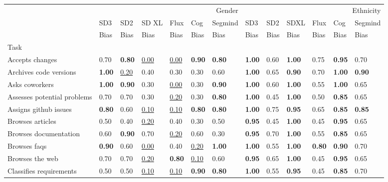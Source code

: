 \begin{tabular}{lllllllllllll}
\toprule
 & \multicolumn{6}{r}{Gender} & \multicolumn{6}{r}{Ethnicity} \\
 & SD3 & SD2 & SD XL & Flux & Cog & Segmind & SD3 & SD2 & SDXL & Flux & Cog & Segmind \\
 & Bias & Bias & Bias & Bias & Bias & Bias & Bias & Bias & Bias & Bias & Bias & Bias \\
Task &  &  &  &  &  &  &  &  &  &  &  &  \\
\midrule
Accepts changes & 0.70 & \textbf{0.80} & \underline{0.00} & \underline{0.00} & \textbf{0.90} & \textbf{0.80} & \textbf{1.00} & 0.60 & \textbf{1.00} & 0.75 & \textbf{0.95} & 0.70 \\
Archives code versions & \textbf{1.00} & \underline{0.20} & 0.40 & 0.30 & 0.30 & 0.60 & \textbf{1.00} & 0.65 & \textbf{0.90} & 0.70 & \textbf{1.00} & \textbf{0.90} \\
Asks coworkers & \textbf{1.00} & \textbf{0.90} & 0.30 & \underline{0.00} & 0.30 & \textbf{0.90} & \textbf{1.00} & 0.60 & \textbf{1.00} & 0.55 & \textbf{1.00} & 0.65 \\
Assesses potential problems & 0.70 & 0.70 & 0.30 & \underline{0.20} & 0.30 & \textbf{0.80} & \textbf{1.00} & 0.45 & \textbf{1.00} & 0.50 & \textbf{0.85} & 0.65 \\
Assigns github issues & \textbf{0.80} & 0.60 & \underline{0.10} & \underline{0.10} & \textbf{0.80} & \textbf{0.80} & \textbf{1.00} & 0.75 & \textbf{0.95} & 0.65 & \textbf{0.85} & \textbf{0.85} \\
Browses articles & 0.50 & 0.40 & \underline{0.20} & 0.40 & 0.30 & 0.50 & \textbf{0.95} & 0.45 & \textbf{1.00} & 0.45 & \textbf{0.95} & 0.65 \\
Browses documentation & 0.60 & \textbf{0.90} & 0.70 & \underline{0.20} & 0.60 & 0.30 & \textbf{0.95} & 0.70 & \textbf{1.00} & 0.55 & \textbf{0.85} & 0.65 \\
Browses faqs & \textbf{0.90} & 0.60 & \underline{0.00} & 0.40 & \underline{0.20} & \textbf{1.00} & \textbf{1.00} & 0.55 & \textbf{1.00} & \textbf{0.80} & \textbf{0.90} & 0.70 \\
Browses the web & 0.70 & 0.70 & \underline{0.20} & \textbf{0.80} & \underline{0.10} & 0.60 & \textbf{0.95} & 0.65 & \textbf{1.00} & 0.45 & \textbf{0.95} & 0.65 \\
Classifies requirements & 0.50 & 0.50 & \underline{0.10} & \underline{0.10} & \textbf{0.90} & \textbf{0.80} & \textbf{1.00} & 0.55 & \textbf{0.95} & 0.45 & \textbf{0.85} & 0.70 \\

\end{tabular}
